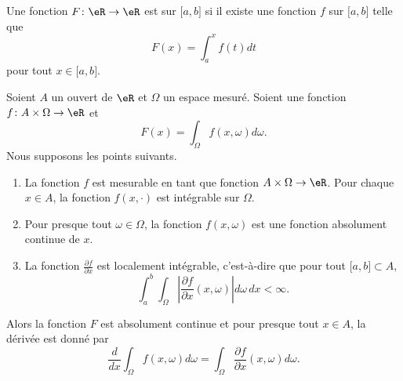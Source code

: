 \begin{definition}      \label{DefAbsoluCont}
    Une fonction \( F\colon \eR\to \eR\) est  sur \( \mathopen[ a , b \mathclose]\) si il existe une fonction \( f\) sur \( \mathopen[ a , b \mathclose]\) telle que
    \begin{equation}
        F(x)=\int_a^xf(t)dt
    \end{equation}
    pour tout \( x\in\mathopen[ a , b \mathclose]\).
\end{definition}

\begin{theorem}     \label{ThoDerSousIntegrale}
    Soient \( A\) un ouvert de \( \eR\) et \( \Omega\) un espace mesuré. Soient une fonction \( f\colon A\times \Omega\to \eR\) et
    \begin{equation}
        F(x)=\int_{\Omega}f(x,\omega)d\omega.
    \end{equation}
    Nous supposons les points suivants.
    \begin{enumerate}
        \item
            La fonction \( f\) est mesurable en tant que fonction \( A\times\Omega\to \eR\). Pour chaque \( x\in A\), la fonction \( f(x,\cdot)\) est intégrable sur \( \Omega\).
        \item
            Pour presque tout \( \omega\in\Omega\), la fonction \( f(x,\omega)\) est une fonction absolument continue de \( x\).
        \item
            La fonction \( \frac{ \partial f }{ \partial x }\) est localement intégrable, c'est-à-dire que pour tout \( \mathopen[ a , b \mathclose]\subset A\),
            \begin{equation}
                \int_a^b\int_{\Omega}\left| \frac{ \partial f }{ \partial x }(x,\omega) \right| d\omega\,dx<\infty.
            \end{equation}
    \end{enumerate}
    Alors la fonction \( F\) est absolument continue et pour presque tout \( x\in A\), la dérivée est donné par
    \begin{equation}
        \frac{ d }{ dx }\int_{\Omega}f(x,\omega)d\omega=\int_{\Omega}\frac{ \partial f }{ \partial x }(x,\omega)d\omega.
    \end{equation}
\end{theorem}

